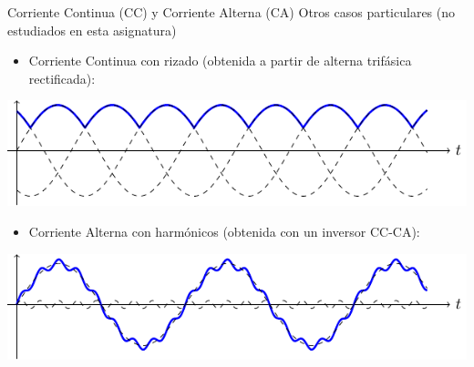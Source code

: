 \documentclass[aspectratio=169, xcolor={usenames,svgnames,dvipsnames}]{beamer}
\begin{document}
\begin{frame}{Corriente Continua (CC) y Corriente Alterna (CA)}
{Otros casos particulares (no estudiados en esta asignatura)}
    \begin{itemize}
        \item Corriente \alert{Continua con rizado} (obtenida a partir de alterna trifásica rectificada):
    \end{itemize}
    \begin{center}
        \includegraphics[height=0.25\textheight]{../figs/CA_rectificada.pdf}
    \end{center}
    \vspace{-4mm}
    \begin{itemize}
        \item Corriente \alert{Alterna con harmónicos} (obtenida con un inversor CC-CA):
    \end{itemize}
    \begin{center}
        \includegraphics[height=0.25\textheight]{../figs/CA_armonicos.pdf}
    \end{center}
\end{frame}

\end{document}

